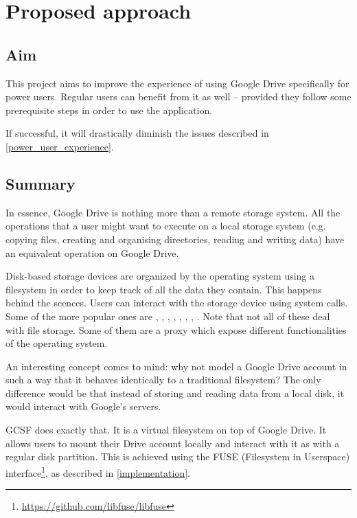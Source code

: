 \chapter{Proposed approach}

\section{Aim}

This project aims to improve the experience of using Google Drive specifically for power users. Regular users can benefit from it as well -- provided they follow some prerequisite steps in order to use the application.

If successful, it will drastically diminish the issues described in \ref{power_user_experience}.

\section{Summary}

In essence, Google Drive is nothing more than a remote storage system. All the operations that a user might want to execute on a local storage system (e.g. copying files, creating and organising directories, reading and writing data) have an equivalent operation on Google Drive.

Disk-based storage devices are organized by the operating system using a filesystem in order to keep track of all the data they contain. This happens behind the scences. Users can interact with the storage device using system calls. Some of the more popular ones are , , , , , , , . Note that not all of these deal with file storage. Some of them are a proxy which expose different functionalities of the operating system.

An interesting concept comes to mind: why not model a Google Drive account in such a way that it behaves identically to a traditional filesystem? The only difference would be that instead of storing and reading data from a local disk, it would interact with Google's servers.

GCSF does exactly that. It is a virtual filesystem on top of Google Drive. It allows users to mount their Drive account locally and interact with it as with a regular disk partition. This is achieved using the FUSE (Filesystem in Userspace) interface\footnote{\url{https://github.com/libfuse/libfuse}}, as described in \ref{implementation}.

